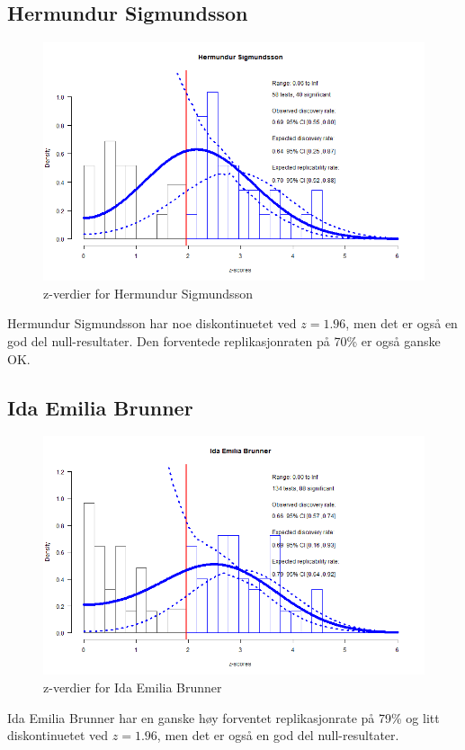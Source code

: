 \documentclass[doc,norsk]{apa7}
\begin{document}
\subsection{Hermundur Sigmundsson}
\begin{figure}[h!]
    \centering
    \includegraphics[width=\textwidth]{images/Hermundur Sigmundsson.png}
    \caption{z-verdier for Hermundur Sigmundsson}
\end{figure}
Hermundur Sigmundsson har noe diskontinuetet ved $z=1.96$, men det er også en god del null-resultater. Den forventede replikasjonraten på 70\% er også ganske OK.

\subsection{Ida Emilia Brunner}
\begin{figure}[h!]
    \centering
    \includegraphics[width=\textwidth]{images/Ida Emilia Brunner.png}
    \caption{z-verdier for Ida Emilia Brunner}
\end{figure}
Ida Emilia Brunner har en ganske høy forventet replikasjonrate på 79\% og litt diskontinuetet ved $z=1.96$, men det er også en god del null-resultater.
\end{document}
